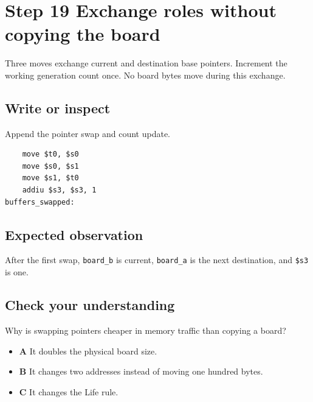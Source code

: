 \section{Step 19 Exchange roles without copying the
  board}\label{008-life-generations-s19-step-19-exchange-roles-without-copying-the-board}

Three moves exchange current and destination base pointers. Increment
the working generation count once. No board bytes move during this
exchange.

\subsection{Write or
  inspect}\label{008-life-generations-s19-write-or-inspect}

Append the pointer swap and count update.

\begin{verbatim}
    move $t0, $s0
    move $s0, $s1
    move $s1, $t0
    addiu $s3, $s3, 1
buffers_swapped:
\end{verbatim}

\subsection{Expected
  observation}\label{008-life-generations-s19-expected-observation}

After the first swap, \texttt{board\_b} is current, \texttt{board\_a} is
the next destination, and \texttt{\$s3} is one.

\subsection{Check your
  understanding}\label{008-life-generations-s19-check-your-understanding}

Why is swapping pointers cheaper in memory traffic than copying a board?

\begin{itemize}
  \tightlist
  \item
        \textbf{A} It doubles the physical board size.
  \item
        \textbf{B} It changes two addresses instead of moving one hundred
        bytes.
  \item
        \textbf{C} It changes the Life rule.
\end{itemize}
